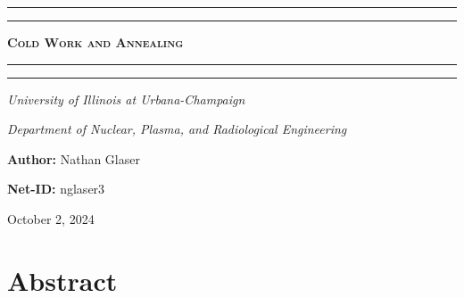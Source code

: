 \documentclass{article}
\begin{document}
\newcommand{\Fig}[3]{\begin{figure}[!h!]\centering\texttt{[image: \#1]}\caption{#2}\label{#3}\end{figure}}
\begin{titlepage}

\centering
\scshape
\vspace{\baselineskip}

%
\rule{\textwidth}{1.6pt}\vspace*{-\baselineskip}\vspace*{2pt}
\rule{\textwidth}{0.4pt}

{\Huge \textbf{\textsc{ Cold Work and Annealing \\
\vspace{15pt}}}}

\rule{\textwidth}{0.4pt}\vspace*{-\baselineskip}\vspace{3.2pt}
\rule{\textwidth}{1.6pt}\vspace{6pt}
\centerline{\textit{University of Illinois at Urbana-Champaign}} 
\centerline{\textit{Department of Nuclear, Plasma, and Radiological Engineering}}
\vspace{1.5\baselineskip}


\large \centerline{\textbf{Author:} Nathan Glaser}
\large \centerline{\textbf{Net-ID:} nglaser3}
\quad

\vfill
\large \centerline{October 2, 2024}
%
\end{titlepage}

\tableofcontents
\newpage
{}
 
\section{Abstract}
\end{document}
